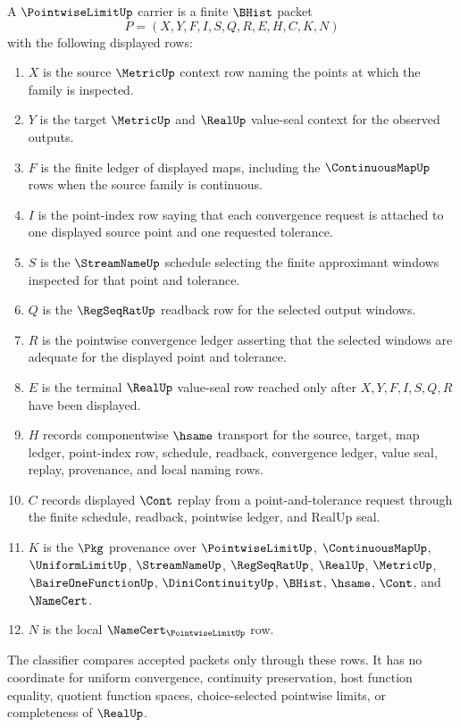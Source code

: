 \begin{definition}
\label{def:pointwise-limit-carrier}
A $\PointwiseLimitUp$ carrier is a finite $\BHist$ packet
$$
P=(X,Y,F,I,S,Q,R,E,H,C,K,N)
$$
with the following displayed rows:
\begin{enumerate}
\item $X$ is the source $\MetricUp$ context row naming the points at which the family is inspected.
\item $Y$ is the target $\MetricUp$ and $\RealUp$ value-seal context for the observed outputs.
\item $F$ is the finite ledger of displayed maps, including the $\ContinuousMapUp$ rows when the source family is continuous.
\item $I$ is the point-index row saying that each convergence request is attached to one displayed source point and one requested tolerance.
\item $S$ is the $\StreamNameUp$ schedule selecting the finite approximant windows inspected for that point and tolerance.
\item $Q$ is the $\RegSeqRatUp$ readback row for the selected output windows.
\item $R$ is the pointwise convergence ledger asserting that the selected windows are adequate for the displayed point and tolerance.
\item $E$ is the terminal $\RealUp$ value-seal row reached only after $X,Y,F,I,S,Q,R$ have been displayed.
\item $H$ records componentwise $\hsame$ transport for the source, target, map ledger, point-index row, schedule, readback, convergence ledger, value seal, replay, provenance, and local naming rows.
\item $C$ records displayed $\Cont$ replay from a point-and-tolerance request through the finite schedule, readback, pointwise ledger, and RealUp seal.
\item $K$ is the $\Pkg$ provenance over $\PointwiseLimitUp$, $\ContinuousMapUp$, $\UniformLimitUp$, $\StreamNameUp$, $\RegSeqRatUp$, $\RealUp$, $\MetricUp$, $\BaireOneFunctionUp$, $\DiniContinuityUp$, $\BHist$, $\hsame$, $\Cont$, and $\NameCert$.
\item $N$ is the local $\NameCert_{\PointwiseLimitUp}$ row.
\end{enumerate}
The classifier compares accepted packets only through these rows. It has no coordinate for uniform convergence, continuity preservation, host function equality, quotient function spaces, choice-selected pointwise limits, or completeness of $\RealUp$.
\end{definition}

